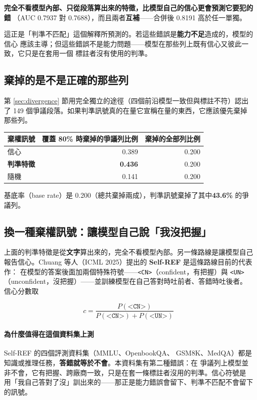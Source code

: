 \documentclass[11pt,a4paper]{ctexart}
\newcommand{\fn}[1]{\texttt{#1}}
\begin{document}
\begin{tcolorbox}[colback=green!5, colframe=green!45, title=主要結果]
\textbf{完全不看模型內部、只從段落算出來的特徵，比模型自己的信心更會預測它要犯的錯}
（AUC 0.7937 對 0.7688），而且兩者\textbf{互補}——合併後 0.8191 高於任一單獨。

\medskip
這正是「判準不匹配」這個解釋所預測的。若這些錯誤是\textbf{能力不足}造成的，模型的信心
應該主導；但這些錯誤不是能力問題——模型在那些列上既有信心又彼此一致，它只是在套用一個
標註者沒有使用的判準。
\end{tcolorbox}

\subsection{棄掉的是不是正確的那些列}

第 \ref{sec:divergence} 節用完全獨立的途徑（四個前沿模型一致但與標註不符）認出了 149
個爭議段落。如果判準訊號真的在量它宣稱在量的東西，它應該優先棄掉那些列。

\begin{table}[h]
\centering\small
\begin{tabular}{@{}lrr@{}}
\toprule
棄權訊號 & 覆蓋 80\% 時棄掉的爭議列比例 & 棄掉的全部列比例 \\
\midrule
信心 & 0.389 & 0.200 \\
\rowcolor{green!12}
\textbf{判準特徵} & \textbf{0.436} & 0.200 \\
隨機 & 0.141 & 0.200 \\
\bottomrule
\end{tabular}
\end{table}

基底率（base rate）是 0.200（總共棄掉兩成），判準訊號棄掉了其中\textbf{43.6\%} 的爭議列。

\subsection{換一種棄權訊號：讓模型自己說「我沒把握」}
\label{sec:selfref}

上面的判準特徵是從\textbf{文字}算出來的，完全不看模型內部。另一條路線是讓模型自己
報告信心。Chuang 等人（ICML 2025）提出的 \textbf{Self-REF} 是這條路線目前的代表作：
在模型的答案後面加兩個特殊符號——\fn{<CN>}（confident，有把握）與 \fn{<UN>}
（unconfident，沒把握）——並訓練模型在自己答對時吐前者、答錯時吐後者。信心分數取

\[
c = \frac{P(\texttt{<CN>})}{P(\texttt{<CN>}) + P(\texttt{<UN>})}
\]

\paragraph{為什麼值得在這個資料集上測} Self-REF 的四個評測資料集（MMLU、OpenbookQA、
GSM8K、MedQA）都是知識或推理任務，\textbf{答錯就等於不會}。本資料集有第二種錯誤：在
爭議列上模型並非不會，它有把握、跨廠商一致，只是在套一條標註者沒用的判準。信心符號是
用「我自己答對了沒」訓出來的——那正是能力錯誤會留下、判準不匹配不會留下的訊號。
\end{document}
